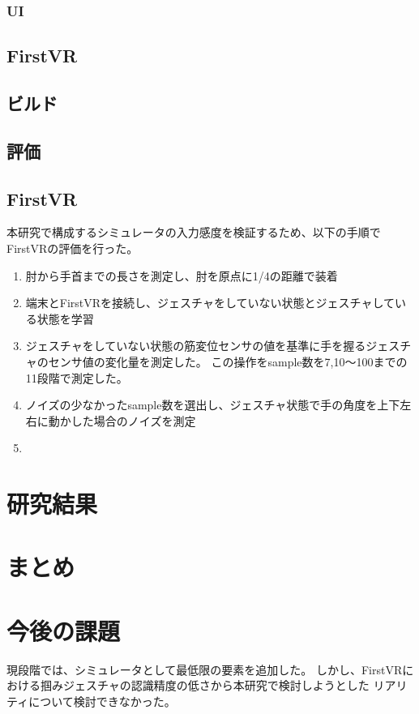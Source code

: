 \documentclass{ltjsreport}
\begin{document}
		\subsection{UI}
		

	\section{FirstVR}
		
	\section{ビルド}
	\section{評価}
		\section{FirstVR}
			本研究で構成するシミュレータの入力感度を検証するため、以下の手順でFirstVRの評価を行った。
			\begin{enumerate}
				\item 肘から手首までの長さを測定し、肘を原点に1/4の距離で装着 \\
				\item 端末とFirstVRを接続し、ジェスチャをしていない状態とジェスチャしている状態を学習 \\
				\item ジェスチャをしていない状態の筋変位センサの値を基準に手を握るジェスチャのセンサ値の変化量を測定した。
					この操作をsample数を7,10〜100までの11段階で測定した。 \\
				\item ノイズの少なかったsample数を選出し、ジェスチャ状態で手の角度を上下左右に動かした場合のノイズを測定 \\
				\item 
			\end{enumerate}
\chapter{研究結果}
\chapter{まとめ}

\chapter{今後の課題}
	現段階では、シミュレータとして最低限の要素を追加した。
	しかし、FirstVRにおける掴みジェスチャの認識精度の低さから本研究で検討しようとした
	リアリティについて検討できなかった。
\clearpage
\end{document}
